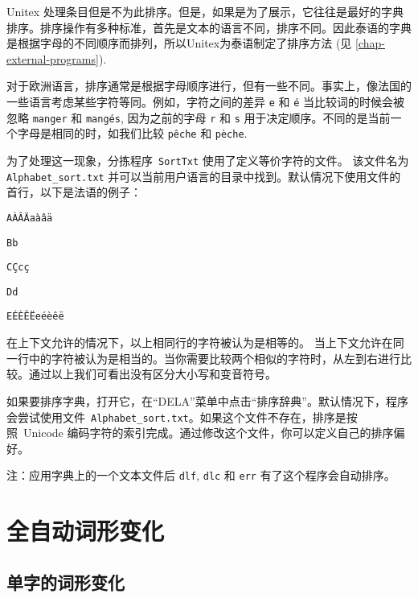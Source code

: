 Unitex 处理条目但是不为此排序。但是，如果是为了展示，它往往是最好的字典排序。排序操作有多种标准，首先是文本的语言不同，排序不同。因此泰语的字典是根据字母的不同顺序而排列，所以Unitex为泰语制定了排序方法 (见
 \ref{chap-external-programs}).

\bigskip
\noindent 对于欧洲语言，排序通常是根据字母顺序进行，但有一些不同。事实上，像法国的一些语言考虑某些字符等同。例如，字符之间的差异
\verb+e+ 和 \texttt{é} 当比较词的时候会被忽略 \verb+manger+ 和
\texttt{mangés}, 因为之前的字母 \verb+r+ 和 \verb+s+ 用于决定顺序。不同的是当前一个字母是相同的时，如我们比较 \texttt{pêche} 和 \texttt{pèche}.

\bigskip {}
\noindent
为了处理这一现象，分拣程序\  \verb+SortTxt+  
 使用了定义等价字符的文件。   该文件名为
\verb+Alphabet_sort.txt+   并可以当前用户语言的目录中找到。默认情况下使用文件的首行，以下是法语的例子：


\bigskip
\noindent
\texttt{AÀÂÄaàâä}

\noindent
\texttt{Bb}

\noindent
\texttt{CÇcç}

\noindent
\texttt{Dd}

\noindent
\texttt{EÉÈÊËeéèêë}


\bigskip
\noindent 
在上下文允许的情况下，以上相同行的字符被认为是相等的。
当上下文允许在同一行中的字符被认为是相当的。当你需要比较两个相似的字符时，从左到右进行比较。通过以上我们可看出没有区分大小写和变音符号。


\bigskip
\noindent 如果要排序字典，打开它，在“DELA”菜单中点击“排序辞典”。默认情况下，程序会尝试使用文件\ \verb+Alphabet_sort.txt+。如果这个文件不存在，排序是按照\ Unicode 编码字符的索引完成。通过修改这个文件，你可以定义自己的排序偏好。


\bigskip
\noindent 注：应用字典上的一个文本文件后
\verb+dlf+, \verb+dlc+ 和 \verb+err+ 有了这个程序会自动排序。
 



\section{全自动词形变化}
\label{section-automatic-inflection}
\subsection{单字的词形变化}

